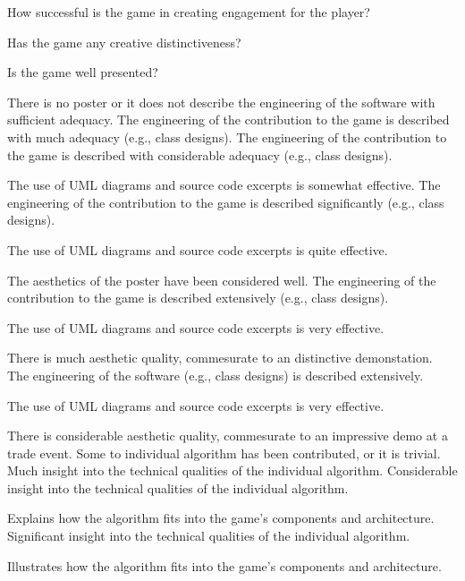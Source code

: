 \documentclass{../../fal_assignment}
\begin{document}
\begin{markingrubric}
{        		\par How successful is the game in creating engagement for the player?
        		\par Has the game any creative distinctiveness?
        		\par Is the game well presented?
        	}
        \grade\fail There is no poster or it does not describe the engineering of the software with sufficient adequacy. 
        \grade The engineering of the contribution to the game is described with much adequacy (e.g., class designs).
        \grade The engineering of the contribution to the game is described with considerable adequacy (e.g., class designs).
            \par The use of UML diagrams and source code excerpts is somewhat effective.
        \grade The engineering of the contribution to the game is described significantly (e.g., class designs).
            \par The use of UML diagrams and source code excerpts is quite effective.
            \par The aesthetics of the poster have been considered well.
        \grade The engineering of the contribution to the game is described extensively (e.g., class designs).
            \par The use of UML diagrams and source code excerpts is very effective.
            \par There is much aesthetic quality, commesurate to an distinctive demonstation.
        \grade The engineering of the software (e.g., class designs) is described extensively.
            \par The use of UML diagrams and source code excerpts is very effective.
            \par There is considerable aesthetic quality, commesurate to an impressive demo at a trade event.
%
        \grade\fail Some to individual algorithm has been contributed, or it is trivial.
        \grade Much insight into the technical qualities of the individual algorithm.
        \grade Considerable insight into the technical qualities of the individual algorithm.
            \par Explains how the algorithm fits into the game's components and architecture.
        \grade Significant insight into the technical qualities of the individual algorithm.
            \par Illustrates how the algorithm fits into the game's components and architecture.

\end{markingrubric}
\end{document}
